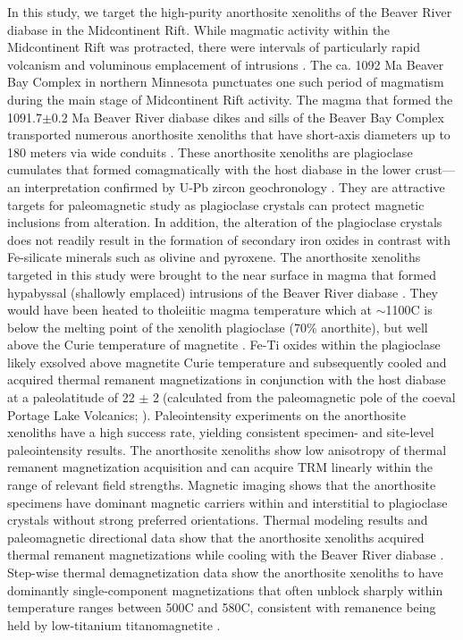 \documentclass[9pt,twocolumn,twoside,lineno]{pnas-new}
\begin{document}
In this study, we target the high-purity anorthosite xenoliths of the Beaver River diabase in the Midcontinent Rift. While magmatic activity within the Midcontinent Rift was protracted, there were intervals of particularly rapid volcanism and voluminous emplacement of intrusions \cite{Swanson-Hysell2021a}. The ca. 1092 Ma Beaver Bay Complex in northern Minnesota punctuates one such period of magmatism during the main stage of Midcontinent Rift activity. The magma that formed the 1091.7$\pm$0.2 Ma Beaver River diabase dikes and sills of the Beaver Bay Complex transported numerous anorthosite xenoliths that have short-axis diameters up to 180 meters via wide conduits \cite{Boerboom2004a, Boerboom2006b}. These anorthosite xenoliths are plagioclase cumulates that formed comagmatically with the host diabase in the lower crust---an interpretation confirmed by U-Pb zircon geochronology \cite{Zhang2021b}. They are attractive targets for paleomagnetic study as plagioclase crystals can protect magnetic inclusions from alteration. In addition, the alteration of the plagioclase crystals does not readily result in the formation of secondary iron oxides in contrast with Fe-silicate minerals such as olivine and pyroxene. The anorthosite xenoliths targeted in this study were brought to the near surface in magma that formed hypabyssal (shallowly emplaced) intrusions of the Beaver River diabase \cite{Zhang2021b}. They would have been heated to tholeiitic magma temperature which at $\sim$1100\textdegree C is below the melting point of the xenolith plagioclase (70$\%$ anorthite), but well above the Curie temperature of magnetite \cite{Zhang2021b}. Fe-Ti oxides within the plagioclase likely exsolved above magnetite Curie temperature \cite{Bian2021a} and subsequently cooled and acquired thermal remanent magnetizations in conjunction with the host diabase at a paleolatitude of 22 $\pm$ 2\textdegree$\;$(calculated from the paleomagnetic pole of the coeval Portage Lake Volcanics; \citealp{Swanson-Hysell2019a}). Paleointensity experiments on the anorthosite xenoliths have a high success rate, yielding consistent specimen- and site-level paleointensity results. The anorthosite xenoliths show low anisotropy of thermal remanent magnetization acquisition and can acquire TRM linearly within the range of relevant field strengths. Magnetic imaging shows that the anorthosite specimens have dominant magnetic carriers within and interstitial to plagioclase crystals without strong preferred orientations. Thermal modeling results and paleomagnetic directional data show that the anorthosite xenoliths acquired thermal remanent magnetizations while cooling with the Beaver River diabase \cite{Zhang2021b}. Step-wise thermal demagnetization data show the anorthosite xenoliths to have dominantly single-component magnetizations that often unblock sharply within temperature ranges between 500\textdegree C and 580\textdegree C, consistent with remanence being held by low-titanium titanomagnetite \cite{Zhang2021b}. 
\end{document}

